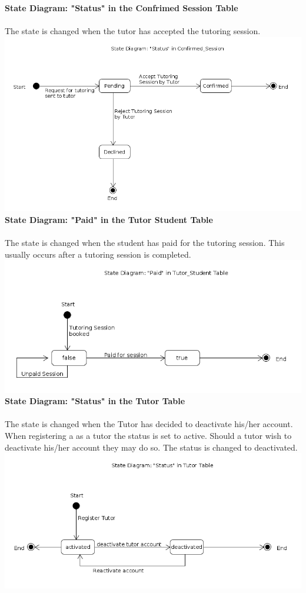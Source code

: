 \documentclass[12pt]{article}
\begin{document}
\textbf{State Diagram: "Status" in the Confrimed Session Table}\\\\
\text The state is changed when the tutor has accepted the tutoring session.
\includegraphics[width=140mm]{./state_diagram/statediagram_status.png}
\\
\textbf{State Diagram: "Paid" in the Tutor Student Table}\\\\
\text The state is changed when the student has paid for the tutoring session. This usually occurs after a tutoring session is completed.
\includegraphics[width=140mm]{./state_diagram/statediagram_paid.png}
\\

\textbf{State Diagram: "Status" in the Tutor Table}\\\\
\text The state is changed when the Tutor has decided to deactivate his/her account. When registering a as a tutor the status is set to active. Should a tutor wish to deactivate his/her account they may do so. The status is changed to deactivated.\\
\includegraphics[width=140mm]{./state_diagram/state_diagram_status_tutor.png}
\\
\end{document}
